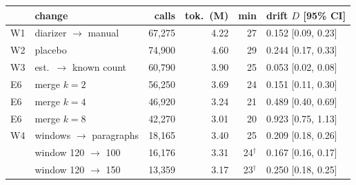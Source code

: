 \begin{tabular}{@{}llrrrl@{}}
\toprule
& change & calls & tok.\ (M) & min & drift $D$ [95\% CI] \\
\midrule
W1 & diarizer $\to$ manual & 67,275 & 4.22 & 27 & 0.152 [0.09, 0.23] \\
W2 & placebo & 74,900 & 4.60 & 29 & 0.244 [0.17, 0.33] \\
W3 & est.\ $\to$ known count & 60,790 & 3.90 & 25 & 0.053 [0.02, 0.08] \\
\midrule
E6 & merge $k=2$ & 56,250 & 3.69 & 24 & 0.151 [0.11, 0.30] \\
E6 & merge $k=4$ & 46,920 & 3.24 & 21 & 0.489 [0.40, 0.69] \\
E6 & merge $k=8$ & 42,270 & 3.01 & 20 & 0.923 [0.75, 1.13] \\
\midrule
W4 & windows $\to$ paragraphs & 18,165 & 3.40 & 25 & 0.209 [0.18, 0.26] \\
 & window 120 $\to$ 100 & 16,176 & 3.31 & 24$^\dagger$ & 0.167 [0.16, 0.17] \\
 & window 120 $\to$ 150 & 13,359 & 3.17 & 23$^\dagger$ & 0.250 [0.18, 0.25] \\
\bottomrule
\end{tabular}
